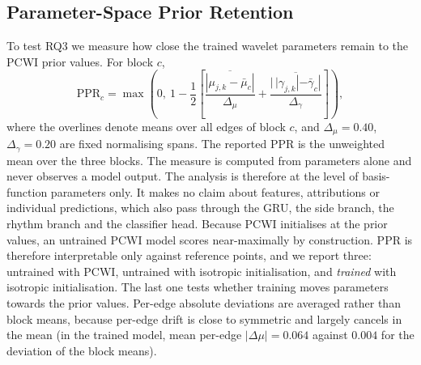 \documentclass[preprint,12pt]{elsarticle}
\begin{document}
\subsection{Parameter-Space Prior Retention}
\label{sec:ppr_def}
To test RQ3 we measure how close the trained wavelet parameters remain to the PCWI prior values. For block $c$,
\begin{equation}
\mathrm{PPR}_c = \max\!\left(0,\ 1 - \frac{1}{2}\left[\frac{\overline{|\mu_{j,k} - \bar\mu_c|}}{\Delta_\mu} + \frac{\overline{|\,|\gamma_{j,k}| - \bar\gamma_c|}}{\Delta_\gamma}\right]\right),
\label{eq:ppr}
\end{equation}
where the overlines denote means over all edges of block $c$, and $\Delta_\mu = 0.40$, $\Delta_\gamma = 0.20$ are fixed normalising spans. The reported PPR is the unweighted mean over the three blocks. The measure is computed from parameters alone and never observes a model output. The analysis is therefore at the level of basis-function parameters only. It makes no claim about features, attributions or individual predictions, which also pass through the GRU, the side branch, the rhythm branch and the classifier head. Because PCWI initialises at the prior values, an untrained PCWI model scores near-maximally by construction. PPR is therefore interpretable only against reference points, and we report three: untrained with PCWI, untrained with isotropic initialisation, and \emph{trained} with isotropic initialisation. The last one tests whether training moves parameters towards the prior values. Per-edge absolute deviations are averaged rather than block means, because per-edge drift is close to symmetric and largely cancels in the mean (in the trained model, mean per-edge $|\Delta\mu| = 0.064$ against $0.004$ for the deviation of the block means).
\end{document}
